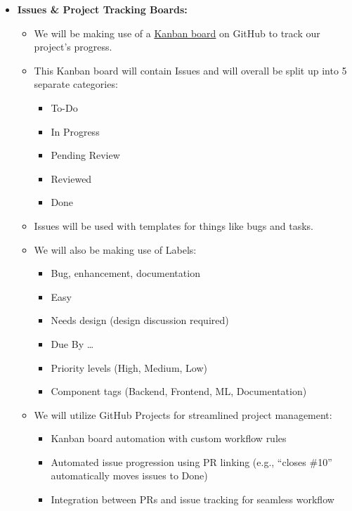 \documentclass{article}
\begin{document}
\begin{itemize}
    \item \textbf{Issues \& Project Tracking Boards:}
    \begin{itemize}
        \item We will be making use of a \href{https://github.com/users/DylanG5/projects/5}{Kanban board} on GitHub to track our project's progress.
        \item This Kanban board will contain Issues and will overall be split up into 5 separate categories:
        \begin{itemize}
            \item To-Do
            \item In Progress
            \item Pending Review
            \item Reviewed
            \item Done
        \end{itemize}
        \item Issues will be used with templates for things like bugs and tasks.
        \item We will also be making use of Labels:
        \begin{itemize}
            \item Bug, enhancement, documentation
            \item Easy
            \item Needs design (design discussion required)
            \item Due By \dots
            \item Priority levels (High, Medium, Low)
            \item Component tags (Backend, Frontend, ML, Documentation)
        \end{itemize}
        \item We will utilize GitHub Projects for streamlined project management:
        \begin{itemize}
            \item Kanban board automation with custom workflow rules
            \item Automated issue progression using PR linking (e.g., ``closes \#10'' automatically moves issues to Done)
            \item Integration between PRs and issue tracking for seamless workflow
        \end{itemize}
    \end{itemize}


\end{itemize}
\end{document}
